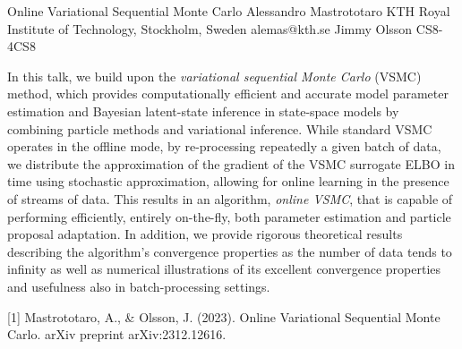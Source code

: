 \begin{talk}
  {Online Variational Sequential Monte Carlo}%
  {Alessandro Mastrototaro}%
  {KTH Royal Institute of Technology, Stockholm, Sweden}%
  {alemas@kth.se}%
  {Jimmy Olsson}%
{}{}{CS8-4}{CS8}


In this talk, we build upon the \emph{variational sequential Monte Carlo} (VSMC) method, which provides computationally efficient and accurate model parameter estimation and Bayesian latent-state inference in state-space models by combining particle methods and variational inference. While standard VSMC operates in the offline mode, by re-processing repeatedly a given batch of data, we distribute the approximation of the gradient of the VSMC surrogate ELBO in time using stochastic approximation, allowing for online learning in the presence of streams of data. This results in an algorithm, \emph{online VSMC}, that is capable of performing efficiently, entirely on-the-fly, both parameter estimation and particle proposal adaptation. In addition, we provide rigorous theoretical results describing the algorithm's convergence properties as the number of data tends to infinity as well as numerical illustrations of its excellent convergence properties and usefulness also in batch-processing settings. 

\medskip

{\footnotesize [1] Mastrototaro, A., \& Olsson, J. (2023). Online Variational Sequential Monte Carlo. arXiv preprint arXiv:2312.12616.}
\end{talk}

